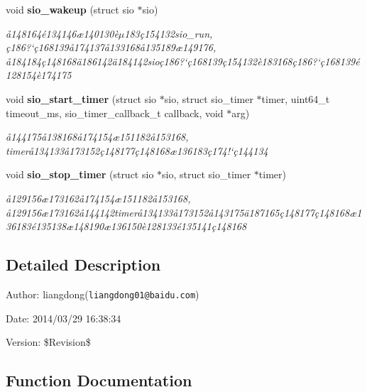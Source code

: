 \begin{CompactItemize}
void {\bf sio\_\-wakeup} (struct sio $\ast$sio)
\begin{CompactList}\small\item\em \aa{}148164\'{e}134146\ae{}140130\`{e}$\mu$183\c{c}154132sio\_\-run, \c{c}186?`\c{c}168139\aa{}174137\aa{}133168\aa{}135189\ae{}149176, \aa{}184184\c{c}148168\"{a}186142\"{a}184142sio\c{c}186?`\c{c}168139\c{c}154132\`{e}183168\c{c}186?`\c{c}168139\'{e}128154\`{e}174175 \item\end{CompactList}\item 
void {\bf sio\_\-start\_\-timer} (struct sio $\ast$sio, struct sio\_\-timer $\ast$timer, uint64\_\-t timeout\_\-ms, sio\_\-timer\_\-callback\_\-t callback, void $\ast$arg)
\begin{CompactList}\small\item\em \aa{}144175\aa{}138168\aa{}174154\ae{}151182\aa{}153168, timer\aa{}134133\aa{}173152\c{c}148177\c{c}148168\ae{}136183\c{c}174!`\c{c}144134 \item\end{CompactList}\item 
void {\bf sio\_\-stop\_\-timer} (struct sio $\ast$sio, struct sio\_\-timer $\ast$timer)
\begin{CompactList}\small\item\em \aa{}129156\ae{}173162\aa{}174154\ae{}151182\aa{}153168, \aa{}129156\ae{}173162\aa{}144142timer\aa{}134133\aa{}173152\aa{}143175\"{a}187165\c{c}148177\c{c}148168\ae{}136183\'{e}135138\ae{}148190\ae{}136150\`{e}128133\'{e}135141\c{c}148168 \item\end{CompactList}\end{CompactItemize}


\subsection{Detailed Description}
\begin{Desc}
\item[Author:]liangdong({\tt liangdong01@baidu.com}) \end{Desc}
\begin{Desc}
\item[Date:]2014/03/29 16:38:34 \end{Desc}
\begin{Desc}
\item[Version:]\$Revision\$ \end{Desc}


\subsection{Function Documentation}
